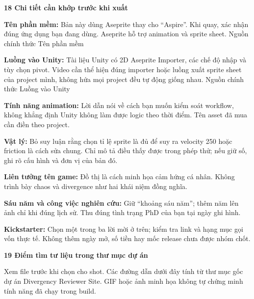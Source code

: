 \documentclass[10pt,a4paper]{article}
\begin{document}
\textbf{18 Chi tiết cần khớp trước khi xuất}\par

\textbf{Tên phần mềm:}  Bản này dùng Aseprite thay cho “Aspire”. Khi quay, xác nhận đúng ứng dụng bạn đang dùng. Aseprite hỗ trợ animation và sprite sheet. Nguồn chính thức Tên phần mềm\par

\clearpage

\textbf{Luồng vào Unity:}  Tài liệu Unity có 2D Aseprite Importer, các chế độ nhập và tùy chọn pivot. Video cần thể hiện đúng importer hoặc luồng xuất sprite sheet của project mình, không hứa mọi project đều tự động giống nhau. Nguồn chính thức Luồng vào Unity\par

\textbf{Tính năng animation:}  Lời dẫn nói về cách bạn muốn kiểm soát workflow, không khẳng định Unity không làm được logic theo thời điểm. Tên asset đã mua cần điền theo project.\par

\textbf{Vật lý:}  Bỏ suy luận rằng chọn tỉ lệ sprite là đủ để suy ra velocity 250 hoặc friction là cách sửa chung. Chỉ mô tả điều thấy được trong phép thử; nếu giữ số, ghi rõ cấu hình và đơn vị của bản đó.\par

\textbf{Liên tưởng tên game:}  Đồ thị là cách minh họa cảm hứng cá nhân. Không trình bày chaos và divergence như hai khái niệm đồng nghĩa.\par

\par

\textbf{Sáu năm và công việc nghiên cứu:}  Giữ “khoảng sáu năm”; thêm năm lên ảnh chỉ khi đúng lịch sử. Thu đúng tình trạng PhD của bạn tại ngày ghi hình.\par

\textbf{Kickstarter:}  Chọn một trong ba lời mời ở trên; kiểm tra link và hạng mục gọi vốn thực tế. Không thêm ngày mở, số tiền hay mốc release chưa được nhóm chốt.\par

\textbf{19 Điểm tìm tư liệu trong thư mục dự án}\par

Xem file trước khi chọn cho shot. Các đường dẫn dưới đây tính từ thư mục gốc dự án Divergency Reviewer Site. GIF hoặc ảnh minh họa không tự chứng minh tính năng đã chạy trong build.\par
\end{document}
